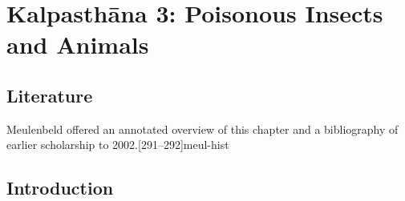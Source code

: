 \chapter{Kalpasthāna 3: Poisonous Insects and Animals}

\section{Literature}

Meulenbeld offered an annotated overview of this chapter and a
bibliography of earlier scholarship to
2002.[291--292]{meul-hist}

\section{Introduction}

